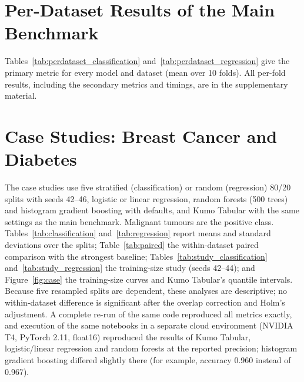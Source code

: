 \appendix

\section{Per-Dataset Results of the Main Benchmark}
\label{app:perdataset}

Tables~\ref{tab:perdataset_classification} and~\ref{tab:perdataset_regression} give the primary metric for every model
and dataset (mean over 10 folds). All per-fold results, including the secondary metrics and timings, are in the
supplementary material.





\section{Case Studies: Breast Cancer and Diabetes}
\label{app:case}

The case studies use five stratified (classification) or random (regression) 80/20 splits with seeds 42--46, logistic
or linear regression, random forests (500 trees) and histogram gradient boosting with defaults, and Kumo Tabular with
the same settings as the main benchmark. Malignant tumours are the positive class. Tables~\ref{tab:classification}
and~\ref{tab:regression} report means and standard deviations over the splits; Table~\ref{tab:paired} the
within-dataset paired comparison with the strongest baseline; Tables~\ref{tab:study_classification}
and~\ref{tab:study_regression} the training-size study (seeds 42--44); and Figure~\ref{fig:case} the training-size
curves and Kumo Tabular's quantile intervals. Because five resampled splits are dependent, these analyses are
descriptive; no within-dataset difference is significant after the overlap correction and Holm's adjustment. A
complete re-run of the same code reproduced all metrics exactly, and execution of the same notebooks in a separate
cloud environment (NVIDIA T4, PyTorch 2.11,
float16) reproduced the results of Kumo Tabular, logistic/linear regression and random forests at the reported
precision; histogram gradient boosting differed slightly there (for example, accuracy 0.960 instead of 0.967).







